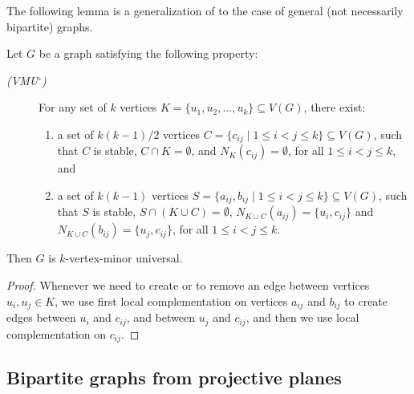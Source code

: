 \documentclass[a4paper,UKenglish,cleveref, autoref, thm-restate]{arxiv}
\newcommand{\ls}{\leqslant}
\begin{document}
The following lemma is a generalization of   to the case of general (not necessarily bipartite) graphs.

\begin{lemma}\label{lemma:VMUcondition_circ}
    Let $G$ be a graph satisfying the following property:
%
    \begin{description}
        \item[{\rm\em (VMU$^\circ$)}] For any set of $k$  vertices $K = \{u_1, u_2, \dots, u_k\} \subseteq V(G)$, there exist:
              \begin{enumerate}%
                  \item a set of $k(k-1)/2$  vertices $C = \{c_{ij} \mid 1 \ls i < j \ls k \} \subseteq V(G)$, such that $C$ is stable,  $C\cap K = \emptyset$, and $N_K(c_{ij}) = \emptyset$, for all $1\ls i < j \ls k$,
                        and
                  \item a set of $k(k-1)$  vertices $S = \{a_{ij},b_{ij} \mid 1 \ls i < j \ls k \} \subseteq V(G)$, such that $S$ is stable, $S\cap (K \cup C) = \emptyset$, $N_{K \cup C}(a_{ij}) = \{u_i, c_{ij}\}$ and $N_{K \cup C}(b_{ij}) = \{u_j, c_{ij}\}$, for all $1 \ls i < j \ls k$.
              \end{enumerate}
    \end{description}
    Then $G$ is $k$-vertex-minor universal.
\end{lemma}
\begin{proof}
    Whenever we need to create or to remove an edge between vertices $u_i, u_j\in K$, we use first local complementation on vertices $a_{ij}$ and $b_{ij}$ to create edges between $u_i$ and $c_{ij}$, and between $u_j$ and $c_{ij}$, and then we use local complementation on $c_{ij}$.
\end{proof}


\subsection{Bipartite graphs from projective planes}
\label{subsec:bipartite-graph-proj-plane}
\end{document}
